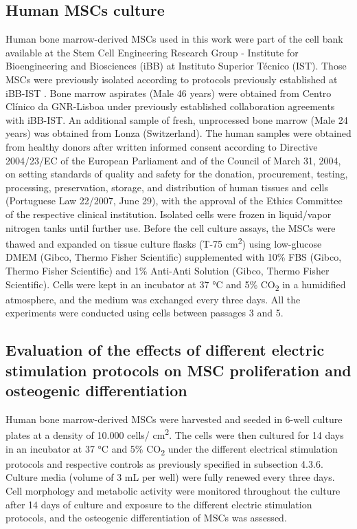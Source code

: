 \subsection{Human \ac{MSCs} culture}
Human bone marrow-derived \ac{MSCs} used in this work were part of the cell bank available at the Stem Cell Engineering Research Group - Institute for Bioengineering and Biosciences (iBB) at Instituto Superior Técnico (IST). Those MSCs were previously isolated according to protocols previously established at iBB-IST \cite{Carvalho2021-ru}. Bone marrow aspirates (Male 46 years) were obtained from Centro Clínico da GNR-Lisboa under previously established collaboration agreements with iBB-IST. An additional sample of fresh, unprocessed bone marrow (Male 24 years) was obtained from Lonza (Switzerland). The human samples were obtained from healthy donors after written informed consent according to Directive 2004/23/EC of the European Parliament and of the Council of March 31, 2004, on setting standards of quality and safety for the donation, procurement, testing, processing, preservation, storage, and distribution of human tissues and cells (Portuguese Law 22/2007, June 29), with the approval of the Ethics Committee of the respective clinical institution. Isolated cells were frozen in liquid/vapor nitrogen tanks until further use. Before the cell culture assays, the \ac{MSCs} were thawed and expanded on tissue culture flasks (T-75 \si{\square\centi\meter}) using low-glucose \acs{DMEM} (Gibco, Thermo Fisher Scientific) supplemented with 10\si{\percent} \acs{FBS} (Gibco, Thermo Fisher Scientific) and 1\si{\percent} Anti-Anti Solution (Gibco, Thermo Fisher Scientific). Cells were kept in an incubator at 37 \si{\celsius} and 5\si{\percent} CO\textsubscript{2} in a humidified atmosphere, and the medium was exchanged every three days. All the experiments were conducted using cells between passages 3 and 5. 

\subsection{Evaluation of the effects of different electric stimulation protocols on MSC proliferation and osteogenic differentiation} 
Human bone marrow-derived \ac{MSCs} were harvested and seeded in 6-well culture plates at a density of 10.000 cells/ \si{\square\centi\meter}. The cells were then cultured for 14 days in an incubator at 37 \si{\celsius} and 5\si{\percent} CO\textsubscript{2} under the different electrical stimulation protocols and respective controls as previously specified in subsection 4.3.6. Culture media (volume of 3 mL per well) were fully renewed every three days. Cell morphology and metabolic activity were monitored throughout the culture after 14 days of culture and exposure to the different electric stimulation protocols, and the osteogenic differentiation of \ac{MSCs} was assessed. 

